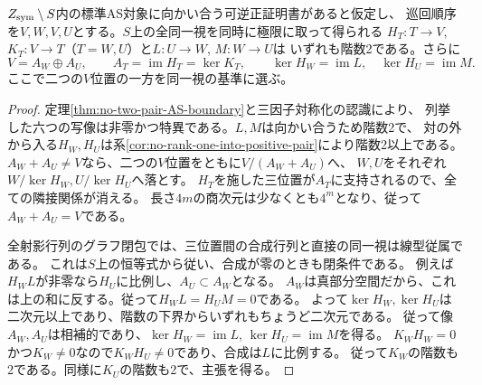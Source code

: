\begin{corollary}[向かい合う一対が残る場合の相補平面]\label{cor:opposite-witness-complementary-planes}
$Z_{\rm sym}\setminus S$内の標準AS対象に向かい合う可逆正証明書があると仮定し、
巡回順序を$V,W,V,U$とする。$S$上の全同一視を同時に極限に取って得られる
$H_T:T\to V$, $K_T:V\to T$（$T=W,U$）と$L:U\to W$, $M:W\to U$は
いずれも階数2である。さらに
\[
 V=A_W\oplus A_U,\qquad A_T=\operatorname{im}H_T=\ker K_T,\qquad
 \ker H_W=\operatorname{im}L,\quad \ker H_U=\operatorname{im}M .
\]
ここで二つの$V$位置の一方を同一視の基準に選ぶ。
\end{corollary}
\begin{proof}
定理\ref{thm:no-two-pair-AS-boundary}と三因子対称化の認識により、
列挙した六つの写像は非零かつ特異である。$L,M$は向かい合うため階数2で、
対の外から入る$H_W,H_U$は系\ref{cor:no-rank-one-into-positive-pair}により階数2以上である。
$A_W+A_U\ne V$なら、二つの$V$位置をともに$V/(A_W+A_U)$へ、
$W,U$をそれぞれ$W/\ker H_W,U/\ker H_U$へ落とす。
$H_T$を施した三位置が$A_T$に支持されるので、全ての隣接関係が消える。
長さ$4m$の商次元は少なくとも$4^m$となり、従って$A_W+A_U=V$である。

全射影行列のグラフ閉包では、三位置間の合成行列と直接の同一視は線型従属である。
これは$S$上の恒等式から従い、合成が零のときも閉条件である。
例えば$H_W L$が非零なら$H_U$に比例し、$A_U\subset A_W$となる。
$A_W$は真部分空間だから、これは上の和に反する。従って$H_W L=H_U M=0$である。
よって$\ker H_W,\ker H_U$は二次元以上であり、階数の下界からいずれもちょうど二次元である。
従って像$A_W,A_U$は相補的であり、$\ker H_W=\operatorname{im}L$,
$\ker H_U=\operatorname{im}M$を得る。
$K_WH_W=0$かつ$K_W\ne0$なので$K_WH_U\ne0$であり、合成は$L$に比例する。
従って$K_W$の階数も2である。同様に$K_U$の階数も2で、主張を得る。
\end{proof}

